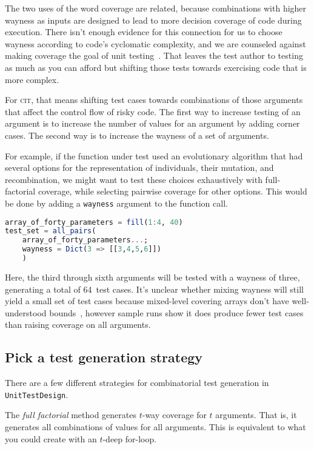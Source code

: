 \documentclass{juliacon}
\newcommand{\utd}{\texttt{UnitTestDesign}\xspace}
\newcommand{\cit}{\textsc{cit}\xspace}
\begin{document}
\vskip 6pt
The two uses of the word coverage are related, because combinations with higher wayness as inputs are designed to lead to more decision coverage of code during execution. There isn't enough evidence for this connection for us to choose wayness according to code's cyclomatic complexity, and we are counseled against making coverage the goal of unit testing~\cite{Inozemtseva2014-gz}. That leaves the test author to testing as much as you can afford but shifting those tests towards exercising code that is more complex.

\vskip 6pt
For \cit, that means shifting test cases towards combinations of those arguments that affect the control flow of risky code. The first way to increase testing of an argument is to increase the number of values for an argument by adding corner cases. The second way is to increase the wayness of a set of arguments.

\vskip 6pt
For example, if the function under test used an evolutionary algorithm that had several options for the representation of individuals, their mutation, and recombination, we might want to test these choices exhaustively with full-factorial coverage, while selecting pairwise coverage for other options. This would be done by adding a \verb|wayness| argument to the function call.

\begin{lstlisting}[language=Julia]
array_of_forty_parameters = fill(1:4, 40)
test_set = all_pairs(
    array_of_forty_parameters...;
    wayness = Dict(3 => [[3,4,5,6]])
    )
\end{lstlisting}
Here, the third through sixth arguments will be tested with a wayness of three, generating a total of 64~test cases. It's unclear whether mixing wayness will still yield a small set of test cases because mixed-level covering arrays don't have well-understood bounds~\cite{Cohen2003-pg}, however sample runs show it does produce fewer test cases than raising coverage on all arguments.


\subsection{Pick a test generation strategy}

There are a few different strategies for combinatorial test generation in \utd.

\vskip 6pt
The \emph{full factorial} method generates $t$-way coverage for $t$ arguments. That is, it generates all combinations of values for all arguments. This is equivalent to what you could create with an $t$-deep for-loop.
\end{document}
